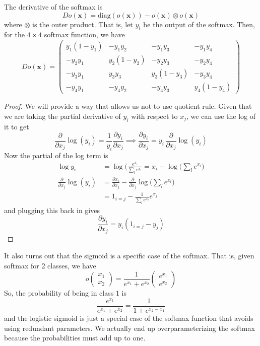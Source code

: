 \documentclass{article}
\begin{document}
    \begin{lemma}
      The derivative of the softmax is 
      \begin{equation}
        D o (\mathbf{x}) = \mathrm{diag}(o (\mathbf{x})) - o (\mathbf{x}) \otimes o (\mathbf{x})
      \end{equation}
      where $\otimes$ is the outer product. That is, let $y_i$ be the output of the softmax. Then, for the $4 \times 4$ softmax function, we have 
      \begin{equation}
        D o(\mathbf{x}) = \begin{pmatrix} y_1 (1 - y_1) & - y_1 y_2 & -y_1 y_3 & - y_1 y_4 \\ -y_2 y_1 & y_2 (1 - y_2) & - y_2 y_3 & - y_2 y_4 \\ -y_3 y_1 & y_3 y_3 & y_3 (1 - y_3) & -y_3 y_4 \\ -y_4 y_1 & -y_4 y_2 & -y_4 y_3 & y_4 (1 - y_4) \end{pmatrix}
      \end{equation}
    \end{lemma}
    \begin{proof}
      We will provide a way that allows us not to use quotient rule. Given that we are taking the partial derivative of $y_i$ with respect to $x_j$, we can use the log of it to get 
      \[\frac{\partial}{\partial x_j} \log (y_i) = \frac{1}{y_i} \frac{\partial y_i}{\partial x_j} \implies \frac{\partial y_i}{\partial x_j} = y_i \, \frac{\partial}{\partial x_j} \log(y_i)\]
      Now the partial of the log term is 
      \begin{align*}
        \log{y_i} & = \log \bigg( \frac{e^{x_i}}{\sum_l e^{x_l}} = x_i - \log \bigg( \sum_l e^{x_l}\bigg) \\
        \frac{\partial}{\partial x_j} \log(y_i) & = \frac{\partial x_i}{\partial x_j} - \frac{\partial}{\partial x_j} \log \bigg( \sum_l e^{x_l}\bigg) \\
        & = 1_{i = j} - \frac{1}{\sum_l e^{x_l}} e^{x_j}
      \end{align*}
      and plugging this back in gives 
      \begin{equation}
        \frac{\partial y_i}{\partial x_j} = y_i (1_{i = j} - y_j)
      \end{equation}
    \end{proof}

    It also turns out that the sigmoid is a specific case of the softmax. That is, given softmax for 2 classes, we have 
    \[o\begin{pmatrix} x_1 \\ x_2 \end{pmatrix} = \frac{1}{e^{x_1} + e^{x_2}} \begin{pmatrix} e^{x_1} \\ e^{x_2} \end{pmatrix}\]
    So, the probability of being in class $1$ is 
    \[\frac{e^{x_1}}{e^{x_1} + e^{x_2}} = \frac{1}{1 + e^{x_2 - x_1}}\]
    and the logistic sigmoid is just a special case of the softmax function that avoids using redundant parameters. We actually end up overparameterizing the softmax because the probabilities must add up to one. 
\end{document}
